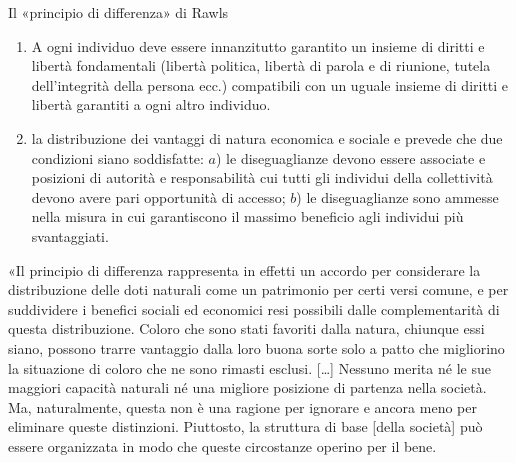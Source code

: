 \documentclass[aspectratio=64,12pt]{beamer}
\begin{document}
\begin{frame}{Il «principio di differenza» di Rawls}
\begin{enumerate}
\item A ogni individuo deve essere innanzitutto garantito un insieme di diritti
e libertà fondamentali (libertà politica, libertà di parola e di
riunione, tutela dell'integrità della persona ecc.) compatibili con un
uguale insieme di diritti e libertà garantiti a ogni altro individuo.
\item la distribuzione dei vantaggi di natura economica e sociale e prevede che
due condizioni siano soddisfatte: $a$) le diseguaglianze devono essere
associate e posizioni di autorità e responsabilità cui tutti gli
individui della collettività devono avere pari opportunità di accesso;
$b$) le diseguaglianze sono ammesse nella misura in cui garantiscono il
massimo beneficio agli individui più svantaggiati.
\end{enumerate}

\bigskip
\begin{resize}{.7}\begin{spacing}{.9}
\begin{quoting}
  «Il principio di differenza rappresenta in effetti un accordo per considerare la distribuzione delle doti naturali come un patrimonio per certi versi comune, e per suddividere i benefici sociali ed economici resi possibili dalle complementarità di questa distribuzione. Coloro che sono stati favoriti dalla natura, chiunque essi siano, possono trarre vantaggio dalla loro buona sorte solo a patto che migliorino la situazione di coloro che ne sono rimasti esclusi. [\dots] Nessuno merita né le sue maggiori capacità naturali né una migliore posizione di partenza nella società. Ma, naturalmente, questa non è una ragione per ignorare e ancora meno per eliminare queste distinzioni. Piuttosto, la struttura di base [della società] può essere organizzata in modo che queste circostanze operino per il bene.
\end{quoting}
\end{spacing}
\end{resize}
\end{frame}
\end{document}
